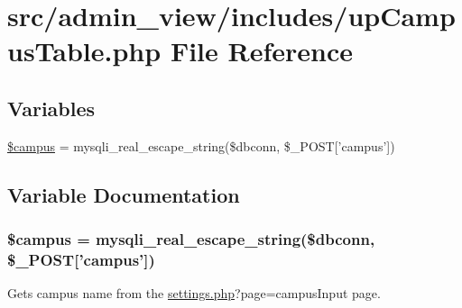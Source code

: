 \hypertarget{upCampusTable_8php}{\section{src/admin\-\_\-view/includes/up\-Campus\-Table.php \-File \-Reference}
\label{upCampusTable_8php}
}
\subsection*{\-Variables}
\begin{DoxyCompactItemize}
\item 
\hyperlink{upCampusTable_8php_a6f0655994f3941d6ab50f681032f899b}{\$campus} = mysqli\-\_\-real\-\_\-escape\-\_\-string(\$dbconn, \$\-\_\-\-P\-O\-S\-T\mbox{[}'campus'\mbox{]})
\end{DoxyCompactItemize}


\subsection{\-Variable \-Documentation}
\hypertarget{upCampusTable_8php_a6f0655994f3941d6ab50f681032f899b}{
\subsubsection[{\$campus}]{\setlength{\rightskip}{0pt plus 5cm}\$campus = mysqli\-\_\-real\-\_\-escape\-\_\-string(\$dbconn, \$\-\_\-\-P\-O\-S\-T\mbox{[}'campus'\mbox{]})}}\label{upCampusTable_8php_a6f0655994f3941d6ab50f681032f899b}
\-Gets campus name from the \hyperlink{settings_8php}{settings.\-php}?page=campus\-Input page. 